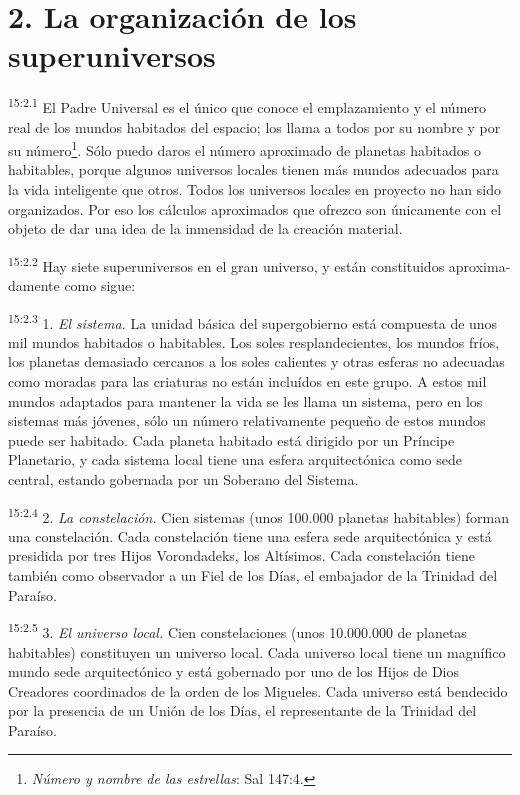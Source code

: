 \section*{2. La organización de los superuniversos}
\par
\textsuperscript{15:2.1} El Padre Universal es el único que conoce el emplazamiento y el número real de los mundos habitados del espacio; los llama a todos por su nombre y por su número\footnote{\textit{Número y nombre de las estrellas}: Sal 147:4.}. Sólo puedo daros el número aproximado de planetas habitados o habitables, porque algunos universos locales tienen más mundos adecuados para la vida inteligente que otros. Todos los universos locales en proyecto no han sido organizados. Por eso los cálculos aproximados que ofrezco son únicamente con el objeto de dar una idea de la inmensidad de la creación material.

\par
\textsuperscript{15:2.2} Hay siete superuniversos en el gran universo, y están constituidos aproxima-damente como sigue:

\par
\textsuperscript{15:2.3} 1. \textit{El sistema.} La unidad básica del supergobierno está compuesta de unos mil mundos habitados o habitables. Los soles resplandecientes, los mundos fríos, los planetas demasiado cercanos a los soles calientes y otras esferas no adecuadas como moradas para las criaturas no están incluídos en este grupo. A estos mil mundos adaptados para mantener la vida se les llama un sistema, pero en los sistemas más jóvenes, sólo un número relativamente pequeño de estos mundos puede ser habitado. Cada planeta habitado está dirigido por un Príncipe Planetario, y cada sistema local tiene una esfera arquitectónica como sede central, estando gobernada por un Soberano del Sistema.

\par
\textsuperscript{15:2.4} 2. \textit{La constelación.} Cien sistemas (unos 100.000 planetas habitables) forman una constelación. Cada constelación tiene una esfera sede arquitectónica y está presidida por tres Hijos Vorondadeks, los Altísimos. Cada constelación tiene también como observador a un Fiel de los Días, el embajador de la Trinidad del Paraíso.

\par
\textsuperscript{15:2.5} 3. \textit{El universo local.} Cien constelaciones (unos 10.000.000 de planetas habitables) constituyen un universo local. Cada universo local tiene un magnífico mundo sede arquitectónico y está gobernado por uno de los Hijos de Dios Creadores coordinados de la orden de los Migueles. Cada universo está bendecido por la presencia de un Unión de los Días, el representante de la Trinidad del Paraíso.


